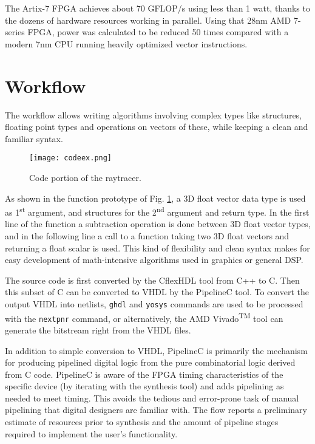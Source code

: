 \documentclass[conference]{IEEEtran}
\begin{document}
The Artix-7 FPGA achieves about 70 GFLOP/s using less than 1 watt, thanks to the dozens of hardware resources working in parallel. Using that 28nm AMD 7-series FPGA, power was calculated to be reduced 50 times compared with a modern 7nm CPU running heavily optimized vector instructions.
\\
\section{Workflow}

The workflow allows writing algorithms involving complex types like structures, floating point types and operations on vectors of these, while keeping a clean and familiar syntax.

\begin{figure}
\texttt{[image: codeex.png]}
\caption{Code portion of the raytracer.}
\label{figcodeex}
\end{figure}

As shown in the function prototype of Fig. \ref{figcodeex}, a 3D float vector data type is used as 1\textsuperscript{st} argument, and structures for the 2\textsuperscript{nd} argument and return type. In the first line of the function a subtraction operation is done between 3D float vector types, and in the following line a call to a function taking two 3D float vectors and returning a float scalar is used. This kind of flexibility and clean syntax makes for easy development of math-intensive algorithms used in graphics or general DSP. 

The source code is first converted by the CflexHDL\cite{cflexhdl} tool from C++ to C. Then this subset of C can be converted to VHDL by the PipelineC\cite{pipelinec} tool. To convert the output VHDL into netlists, \texttt{ghdl} and \texttt{yosys} commands are used to be processed with the \texttt{nextpnr} command, or alternatively, the AMD Vivado\textsuperscript{TM} tool can generate the bitstream right from the VHDL files. 

In addition to simple conversion to VHDL, PipelineC is primarily the mechanism for producing pipelined digital logic from the pure combinatorial logic derived from C code. PipelineC is aware of the FPGA timing characteristics of the specific device (by iterating with the synthesis tool) and adds pipelining as needed to meet timing. This avoids the tedious and error-prone task of manual pipelining that digital designers are familiar with. The flow reports a preliminary estimate of resources prior to synthesis and the amount of pipeline stages required to implement the user’s functionality.
\end{document}
